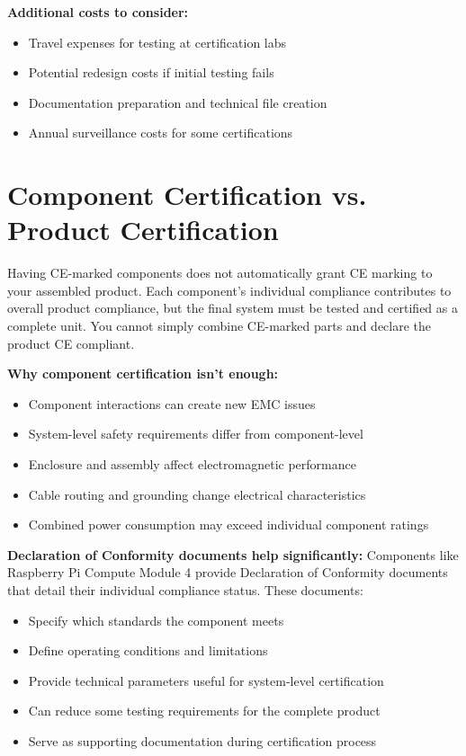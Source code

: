 \textbf{Additional costs to consider:}
\begin{itemize}
\item Travel expenses for testing at certification labs
\item Potential redesign costs if initial testing fails
\item Documentation preparation and technical file creation
\item Annual surveillance costs for some certifications
\end{itemize}

\section{Component Certification vs. Product Certification}

\begin{tcolorbox}[colback=yellow!10,colframe=orange!75!black,title=Critical Misconception: Component CE != Product CE]
Having CE-marked components does not automatically grant CE marking to your assembled product. Each component's individual compliance contributes to overall product compliance, but the final system must be tested and certified as a complete unit. You cannot simply combine CE-marked parts and declare the product CE compliant.
\end{tcolorbox}

\textbf{Why component certification isn't enough:}
\begin{itemize}
\item Component interactions can create new EMC issues
\item System-level safety requirements differ from component-level
\item Enclosure and assembly affect electromagnetic performance
\item Cable routing and grounding change electrical characteristics
\item Combined power consumption may exceed individual component ratings
\end{itemize}

\textbf{Declaration of Conformity documents help significantly:}
Components like Raspberry Pi Compute Module 4 provide Declaration of Conformity documents that detail their individual compliance status. These documents:
\begin{itemize}
\item Specify which standards the component meets
\item Define operating conditions and limitations
\item Provide technical parameters useful for system-level certification
\item Can reduce some testing requirements for the complete product
\item Serve as supporting documentation during certification process
\end{itemize}

